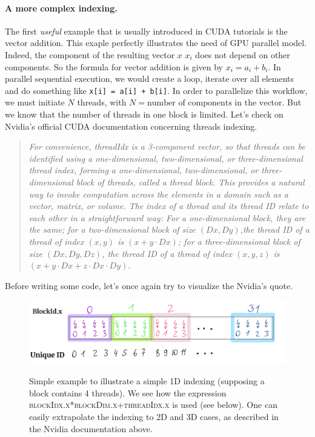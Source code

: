 \documentclass[12pt]{article}
\begin{document}
\paragraph{A more complex indexing.} The first \textit{useful} example 
that is usually introduced in CUDA tutorials is the vector addition. This exaple
perfectly illustrates the need of GPU parallel model. Indeed, the component of the resulting
 vector $x$ $x_i$ does not depend on other components. So the formula for vector addition is given by 
 $x_i = a_i + b_i$. In parallel sequential execution, we would create a loop, iterate over all elements and 
do something like \verb|x[i] = a[i] + b[i]|. In order to parallelize this workflow, we must initiate $N$ 
threads, with $N = \text{number of components in the vector}$. But we know that the number of threads in one 
block is limited. Let's check on Nvidia's official CUDA documentation \cite{center} concerning threads indexing. 
\begin{quote}
   \textsl{For convenience, {\selectfont threadIdx} is a 3-component vector, 
   so that threads can be identified using a one-dimensional, 
   two-dimensional, or three-dimensional thread index, forming a one-dimensional, two-dimensional, 
   or three-dimensional block of threads, called a thread block. This provides a natural way to invoke computation across 
   the elements in a domain such as a vector, matrix, or volume.
   The index of a thread and its thread ID relate to each other 
   in a straightforward way: For a one-dimensional block, they are the same; for 
   a two-dimensional block of size $(Dx, Dy)$,the thread ID of a thread 
   of index $(x, y)$ is $(x + y\cdot Dx)$; for a three-dimensional block of size $(Dx, Dy, Dz)$, the thread ID of a 
   thread of index $(x, y, z)$ is $(x + y\cdot Dx + z\cdot Dx\cdot Dy)$.}
\end{quote}

Before writing some code, let's once again try to visualize the Nvidia's quote.
\begin{figure}[H]
   \centering
   \includegraphics[scale=0.25]{pngs/tindexing.png}
   \label{tindexing}
   \caption{Simple example to illustrate a simple 1D indexing (supposing a block 
   contains 4 threads). We see how the expression \textsc{blockIdx.x*blockDim.x+threadIdx.x} is used (see below). 
   One can easily extrapolate the indexing to 2D and 3D cases, as described in the Nvidia documentation above.
   }
\end{figure}
\end{document}
